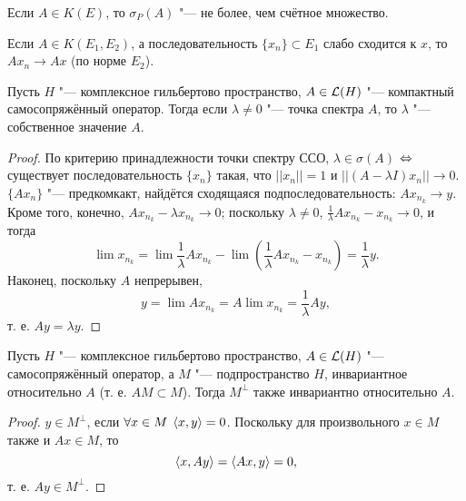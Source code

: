 \documentclass[main]{subfiles}
\begin{document}
\begin{corollary}
  Если \( A \in K(E) \), то \( \sigma_P(A) \) "---
  не более, чем счётное множество.
\end{corollary}

\begin{problem}
  Если \( A \in K(E_1, E_2) \),
  а последовательность \( \{ x_n \} \subset E_1 \)
  слабо сходится к \( x \),
  то \( A x_n \to A x \) (по норме \( E_2 \)).
\end{problem}


\begin{lemma}
  Пусть \( H \) "--- комплексное гильбертово пространство,
  \( A \in \Linears{H} \) "--- компактный самосопряжённый оператор.
  Тогда если \( \lambda \ne 0 \) "--- точка спектра \( A \),
  то \( \lambda \) "--- собственное значение \( A \).
\end{lemma}
\begin{proof}
  По критерию принадлежности точки спектру ССО,
  \( \lambda \in \sigma(A) \) \(\Leftrightarrow\) 
  существует последовательность \( \{ x_n \} \)
  такая, что \( ||x_n|| = 1 \) и
  \( ||(A - \lambda I) x_n|| \to 0 \).
  \( \{ A x_n \} \) "--- предкомкакт,
  найдётся сходящаяся подпоследовательность:
  \( A x_{n_k} \to y \).
  Кроме того, конечно,
  \( A x_{n_k} - \lambda x_{n_k} \to 0 \);
  поскольку \( \lambda \ne 0 \),
  \( \frac1\lambda A x_{n_k} - x_{n_k} \to 0 \),
  и тогда
  \[
    \lim x_{n_k} = \lim \frac1\lambda A x_{n_k} - \lim (\frac1\lambda A x_{n_k} - x_{n_k}) =
    \frac1\lambda y.
  \]
  Наконец, поскольку \( A \) непрерывен,
  \[
    y = \lim A x_{n_k} = A \lim x_{n_k} = \frac1\lambda A y,
  \]
  т. е. \( A y = \lambda y \).
\end{proof}

\begin{lemma}%
  Пусть \( H \) "--- комплексное гильбертово пространство,
  \( A \in \Linears{H} \) "--- самосопряжённый оператор,
  а \( M \) "--- подпространство \( H \),
  инвариантное относительно \( A \)
  (т. е. \( AM \subset M \)).
  Тогда \( M^\perp \) также инвариантно
  относительно \( A \).
\end{lemma}
\begin{proof}
  \( y \in M^\perp \), если \( \forall {x \in M} \; \,
  \langle x, y \rangle = 0 \).
  Поскольку для произвольного \( x \in M \)
  также и \( Ax \in M \), то
  \[
    \langle x, Ay \rangle = \langle Ax, y \rangle = 0,
  \]
  т. е. \( Ay \in M^\perp \).
\end{proof}
\end{document}
